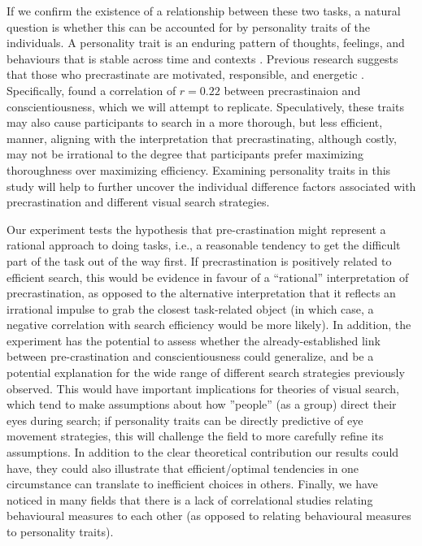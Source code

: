 \documentclass[]{rsos}
\begin{document}
If we confirm the existence of a relationship between these two tasks, a natural question is whether this can be accounted for by personality traits of the individuals.  A personality trait is an enduring pattern of thoughts, feelings, and behaviours that is stable across time and contexts \cite{funder2016}. Previous research suggests that those who precrastinate are motivated, responsible, and energetic \cite{rosenbaum2019}. Specifically, \cite{sauerberger2019} found a correlation of $r = 0.22$ between precrastinaion and  conscientiousness, which we will attempt to replicate. Speculatively, these traits may also cause participants to search in a more thorough, but less efficient, manner, aligning with the interpretation that precrastinating, although costly, may not be irrational to the degree that participants prefer maximizing thoroughness over maximizing efficiency. Examining personality traits in this study will help to further uncover the individual difference factors associated with precrastination and different visual search strategies. 

Our experiment tests the hypothesis that pre-crastination might represent a rational approach to doing tasks, i.e., a reasonable tendency to get the difficult part of the task out of the way first. If precrastination is positively related to efficient search, this would be evidence in favour of a ``rational'' interpretation of precrastination, as opposed to the alternative interpretation that it reflects an irrational impulse to grab the closest task-related object (in which case, a negative correlation with search efficiency would be more likely). In addition, the experiment has the potential to assess whether the already-established link between pre-crastination and conscientiousness could generalize, and be a potential explanation for the wide range of different search strategies previously observed. This would have important implications for theories of visual search, which tend to make assumptions about how ''people'' (as a group) direct their eyes during search; if personality traits can be directly predictive of eye movement strategies, this will challenge the field to more carefully refine its assumptions. In addition to the clear theoretical contribution our results could have, they could also illustrate that efficient/optimal tendencies in one circumstance can translate to inefficient choices in others. Finally, we have noticed in many fields that there is a lack of correlational studies relating behavioural measures to each other (as opposed to relating behavioural measures to personality traits).
\end{document}
